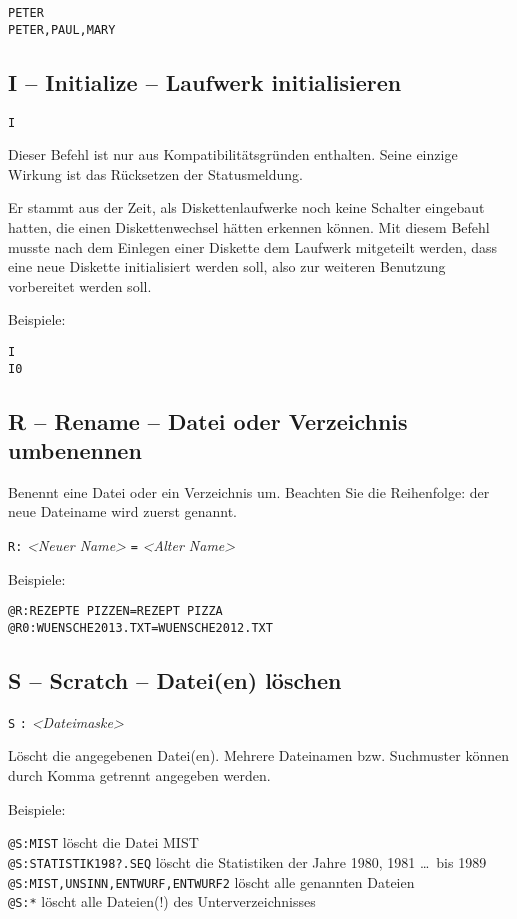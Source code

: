 \documentclass[10pt,a4paper]{scrartcl}		%
\begin{document}
\begin{verbatim}
PETER
PETER,PAUL,MARY
\end{verbatim}

\subsection{I -- Initialize -- Laufwerk initialisieren}

\texttt{I} 

Dieser Befehl ist nur aus Kompatibilitätsgründen enthalten.
Seine einzige Wirkung ist das Rücksetzen der Statusmeldung.

Er stammt aus der Zeit, als Diskettenlaufwerke noch keine Schalter
eingebaut hatten, die einen Diskettenwechsel hätten erkennen können.
Mit diesem Befehl musste nach dem Einlegen einer Diskette dem
Laufwerk mitgeteilt werden, dass eine neue Diskette initialisiert
werden soll, also zur weiteren Benutzung vorbereitet werden soll.

Beispiele:
\begin{verbatim}
I
I0
\end{verbatim}

\subsection{R -- Rename -- Datei oder Verzeichnis umbenennen}
Benennt eine Datei oder ein Verzeichnis um. Beachten Sie die Reihenfolge:
der neue Dateiname wird zuerst genannt.

\texttt{R} \texttt{:}
\textit{<Neuer Name>} \texttt{=} \textit{<Alter Name>}

Beispiele:
\begin{verbatim}
@R:REZEPTE PIZZEN=REZEPT PIZZA
@R0:WUENSCHE2013.TXT=WUENSCHE2012.TXT
\end{verbatim}

\subsection{S -- Scratch -- Datei(en) löschen}
\texttt{S}  \texttt{:}
\textit{<Dateimaske>} \Big[ \texttt{,} \ldots \  \Big]

Löscht die angegebenen Datei(en). Mehrere Dateinamen bzw. Suchmuster
können durch Komma getrennt angegeben werden.

Beispiele:

\texttt{@S:MIST} löscht die Datei MIST\\
\texttt{@S:STATISTIK198?.SEQ} löscht die Statistiken der Jahre 1980, 1981 
\ldots \ bis 1989 \\
\texttt{@S:MIST,UNSINN,ENTWURF,ENTWURF2} löscht alle genannten Dateien \\
\texttt{@S:*} löscht alle Dateien(!) des Unterverzeichnisses
\end{document}
